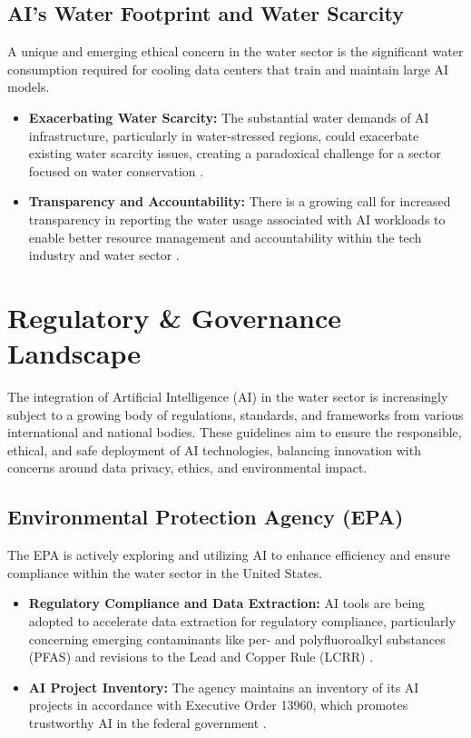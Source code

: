 \subsection{AI's Water Footprint and Water Scarcity}
A unique and emerging ethical concern in the water sector is the significant water consumption required for cooling data centers that train and maintain large AI models.
\begin{itemize}
    \item \textbf{Exacerbating Water Scarcity:} The substantial water demands of AI infrastructure, particularly in water-stressed regions, could exacerbate existing water scarcity issues, creating a paradoxical challenge for a sector focused on water conservation \cite{Illinois_Risks, Investopedia_Risks}.
    \item \textbf{Transparency and Accountability:} There is a growing call for increased transparency in reporting the water usage associated with AI workloads to enable better resource management and accountability within the tech industry and water sector \cite{Illinois_Risks}.
\end{itemize}

\section{Regulatory \& Governance Landscape}

The integration of Artificial Intelligence (AI) in the water sector is increasingly subject to a growing body of regulations, standards, and frameworks from various international and national bodies. These guidelines aim to ensure the responsible, ethical, and safe deployment of AI technologies, balancing innovation with concerns around data privacy, ethics, and environmental impact.

\subsection{Environmental Protection Agency (EPA)}
The EPA is actively exploring and utilizing AI to enhance efficiency and ensure compliance within the water sector in the United States.
\begin{itemize}
    \item \textbf{Regulatory Compliance and Data Extraction:} AI tools are being adopted to accelerate data extraction for regulatory compliance, particularly concerning emerging contaminants like per- and polyfluoroalkyl substances (PFAS) and revisions to the Lead and Copper Rule (LCRR) \cite{AugustaHitech_EPA, Kleinfelder_EPA}.
    \item \textbf{AI Project Inventory:} The agency maintains an inventory of its AI projects in accordance with Executive Order 13960, which promotes trustworthy AI in the federal government \cite{EPA_AI_Inventory}.
\end{itemize}

